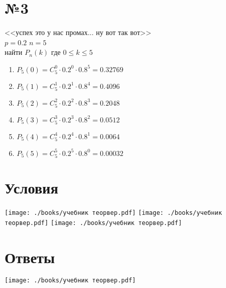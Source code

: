 \documentclass{article}
\newcommand{\hr}{\par\vspace{.5\baselineskip}\noindent\hrulefill\par}
\begin{document}
  \section*{№3}
  <<успех это у нас промах... ну вот так вот>> \\
  $p = 0.2$ \qquad $n=5$ \\
  найти $P_n(k)$ где $0 \leq k \leq 5$

  \begin{enumerate}
    \item $P_5(0) = C^0_5 \cdot 0.2^0 \cdot 0.8^5 = 0.32769$
    \item $P_5(1) = C^1_5 \cdot 0.2^1 \cdot 0.8^4 = 0.4096$
    \item $P_5(2) = C^2_5 \cdot 0.2^2 \cdot 0.8^3 = 0.2048$
    \item $P_5(3) = C^3_5 \cdot 0.2^3 \cdot 0.8^2 = 0.0512$
    \item $P_5(4) = C^4_5 \cdot 0.2^4 \cdot 0.8^1 = 0.0064$
    \item $P_5(5) = C^5_5 \cdot 0.2^5 \cdot 0.8^0 = 0.00032$
  \end{enumerate}

  \begin{center}
  \end{center}


  \hr
  \section*{Условия}
  \texttt{[image: ./books/учебник теорвер.pdf]} \hfill
  \texttt{[image: ./books/учебник теорвер.pdf]} \hfill
  \texttt{[image: ./books/учебник теорвер.pdf]} \hfill

  \section*{Ответы}
  \texttt{[image: ./books/учебник теорвер.pdf]}
\end{document}
